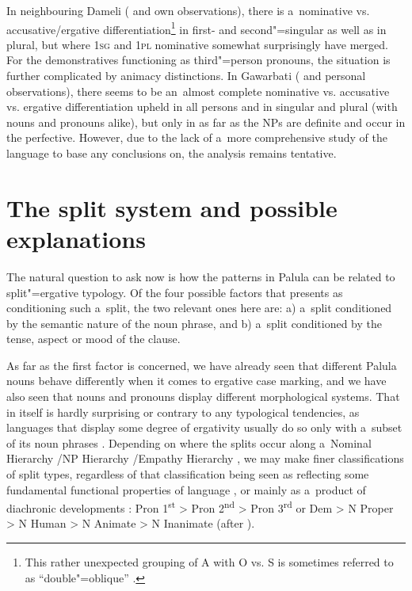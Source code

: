 In neighbouring Dameli (\citealt{morgenstierne1942} and own observations), there is a~nominative vs. accusative/ergative differentiation\footnote{This rather unexpected grouping of A with O vs. S is sometimes referred to as ``double"=oblique'' \citep{payne1980}.} in first- and second"=singular as well as in plural, but where \textsc{1sg} and \textsc{1pl} nominative somewhat surprisingly have merged. For the demonstratives functioning as third"=person pronouns, the situation is further complicated by animacy distinctions. In Gawarbati (\citealt{morgenstierne1950} and personal observations), there seems to be an~almost complete nominative vs. accusative vs. ergative differentiation upheld in all persons and in singular and plural (with nouns and pronouns alike), but only in as far as the NPs are definite and occur in the perfective. However, due to the lack of a~more comprehensive study of the language to base any conclusions on, the analysis remains tentative. 


\section{The split system and possible explanations}
\label{sec:11-5}


The natural question to ask now is how the patterns in Palula can be related to split"=ergative typology. Of the four possible factors that \citet[70]{dixon1994} presents as conditioning such a~split, the two relevant ones here are: a) a~split conditioned by the semantic nature of the noun phrase, and b) a~split conditioned by the tense, aspect or mood of the clause. 



As far as the first factor is concerned, we have already seen that different Palula nouns behave differently when it comes to ergative case marking, and we have also seen that nouns and pronouns display different morphological systems. That in itself is hardly surprising or contrary to any typological tendencies, as languages that display some degree of ergativity usually do so only with a~subset of its noun phrases \citep[261]{garrett1990}. Depending on where the splits occur along a~Nominal Hierarchy \citep[84--85]{dixon1994}/NP Hierarchy \citep[262]{garrett1990}/Empathy Hierarchy \citep[626--627]{delancey1981}, we may make finer classifications of split types, regardless of that classification being seen as reflecting some fundamental functional properties of language \citep{delancey1981}, or mainly as a~product of diachronic developments \citep{garrett1990}: Pron 1\textsuperscript{st} {\textgreater} Pron 2\textsuperscript{nd} {\textgreater} Pron 3\textsuperscript{rd} or Dem {\textgreater} N Proper {\textgreater} N Human {\textgreater} N Animate {\textgreater} N Inanimate (after \citealt[85]{dixon1994}).



